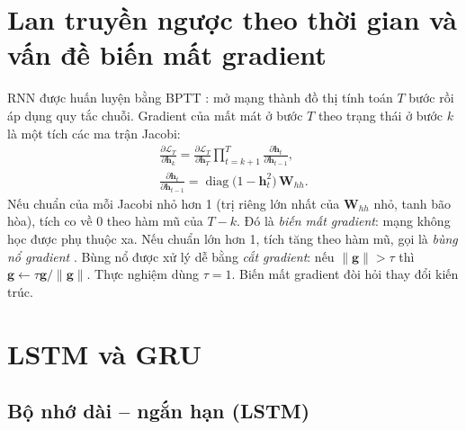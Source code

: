 \section{Lan truyền ngược theo thời gian và vấn đề biến mất gradient}

RNN được huấn luyện bằng BPTT \cite{werbos1990}: mở mạng thành đồ thị tính toán $T$ bước rồi áp dụng quy tắc chuỗi. Gradient của mất mát ở bước $T$ theo trạng thái ở bước $k$ là một tích các ma trận Jacobi:
\begin{equation}
\begin{gathered}
\frac{\partial \mathcal L_T}{\partial \mathbf h_k} = \frac{\partial \mathcal L_T}{\partial \mathbf h_T}\prod_{t=k+1}^{T}\frac{\partial \mathbf h_t}{\partial \mathbf h_{t-1}}, \\
\frac{\partial \mathbf h_t}{\partial \mathbf h_{t-1}} = \operatorname{diag}\!\big(1-\mathbf h_t^2\big)\,\mathbf W_{hh}.
\end{gathered}
\label{eq:bptt}
\end{equation}
Nếu chuẩn của mỗi Jacobi nhỏ hơn 1 (trị riêng lớn nhất của $\mathbf W_{hh}$ nhỏ, tanh bão hòa), tích  co về 0 theo hàm mũ của $T-k$. Đó là \emph{biến mất gradient}: mạng không học được phụ thuộc xa. Nếu chuẩn lớn hơn 1, tích tăng theo hàm mũ, gọi là \emph{bùng nổ gradient} \cite{bengio1994,pascanu2013}. Bùng nổ được xử lý dễ bằng \emph{cắt gradient}: nếu $\|\mathbf g\|>\tau$ thì $\mathbf g \leftarrow \tau\mathbf g/\|\mathbf g\|$. Thực nghiệm dùng $\tau=1$. Biến mất gradient đòi hỏi thay đổi kiến trúc.

\section{LSTM và GRU}

\subsection{Bộ nhớ dài – ngắn hạn (LSTM)}

